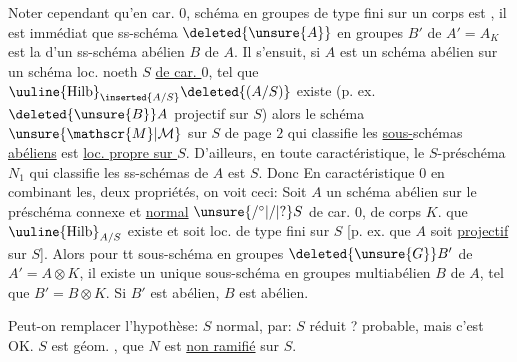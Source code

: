 Noter cependant qu'en car. $0$,
  schéma en groupes de type
fini sur un corps est  ,
il est immédiat  que  ss-schéma
$\deleted{\unsure{A}}$ en groupes  $B'$ de $A'=A_K$ est
la  d'un  ss-schéma abélien
$B$ de $A$. Il s'ensuit, si 
$A$ est un schéma abélien   sur un
schéma loc. noeth $S$ \uline{de car. $0$},  tel
 que $\uuline{\mathrm{Hilb}}_{\inserted{A/S}}\deleted{(A/S)}$ existe 
(p. ex.    $\deleted{\unsure{B}}A$ projectif sur $S$) alors
le schéma $\unsure{\mathscr{M}|\mathcal{M}}$ sur $S$ de page $2$
 qui classifie les \uline{sous-}schémas \uline{abéliens}
 est
\uline{loc. propre sur $S$}. D'ailleurs, en
toute caractéristique, le $S$-préschéma $N_1$
qui classifie les ss-schémas   de
$A$ est     $S$. Donc
En caractéristique $0$ en combinant les,
deux  propriétés, on voit ceci:
  Soit $A$ un schéma abélien sur le
 préschéma connexe et \uline{normal} $\unsure{/^{\circ}|/|?}S$ de
car. $0$, de corps $K$. 
  que
$\uuline{\mathrm{Hilb}}_{A/S}$ existe et soit loc. de type fini sur $S$
[p. ex. que $A$ soit \uline{projectif} sur $S$]. Alors
pour tt sous-schéma en groupes $\deleted{\unsure{G}}B'$ de
$A'=A\otimes K$, il existe un unique sous-schéma
en groupes multiabélien $B$ de $A$,
tel que $B'=B\otimes K$. Si $B'$ est abélien, $B$
est abélien.

Peut-on remplacer l'hypothèse: $S$ normal,
par: $S$ réduit ?  
probable, mais  c'est OK.  $S$ est géom.
,    que $N$ est
\uline{non ramifié} sur $S$.

